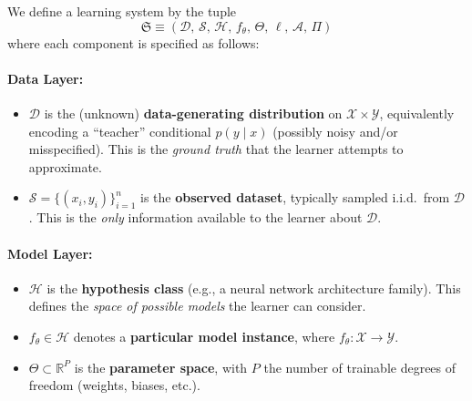 \documentclass[
  journal=largetwo,
  simfonts=false,
  year=2025,
  volume=37,
]{cup-journal}
\begin{document}
\begin{setting}\label{set:ml_system_components}
We define a learning system by the tuple
\begin{equation}
    \boxed{\mathfrak{S} \equiv (\mathcal{D},\, \mathcal{S},\, \mathcal{H},\, f_\theta,\, \Theta,\, \ell,\, \mathcal{A},\, \Pi)}
\end{equation}
where each component is specified as follows:

\paragraph{Data Layer:}
\begin{itemize}
    \item $\mathcal{D}$ is the (unknown) \textbf{data-generating distribution} on $\mathcal{X}\times\mathcal{Y}$, equivalently encoding a ``teacher'' conditional $p(y\mid x)$ (possibly noisy and/or misspecified). This is the \textit{ground truth} that the learner attempts to approximate.
    \item $\mathcal{S}=\{(x_i,y_i)\}_{i=1}^n$ is the \textbf{observed dataset}, typically sampled i.i.d.\ from $\mathcal{D}$. This is the \textit{only} information available to the learner about $\mathcal{D}$.
\end{itemize}

\paragraph{Model Layer:}
\begin{itemize}
    \item $\mathcal{H}$ is the \textbf{hypothesis class} (e.g., a neural network architecture family). This defines the \textit{space of possible models} the learner can consider.
    \item $f_\theta\in\mathcal{H}$ denotes a \textbf{particular model instance}, where $f_\theta: \mathcal{X}\to\mathcal{Y}$.
    \item $\Theta\subset\mathbb{R}^P$ is the \textbf{parameter space}, with $P$ the number of trainable degrees of freedom (weights, biases, etc.).
\end{itemize}


\end{setting}
\end{document}
